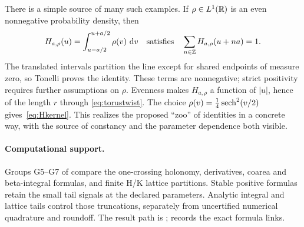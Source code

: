 There is a simple source of many such examples. If $\rho\in L^1(\mathbb R)$
is an even nonnegative probability density, then
\[
 H_{a,\rho}(u)=\int_{u-a/2}^{u+a/2}\rho(v)\,\mathop{}\!\mathrm d v
 \quad\text{satisfies}\quad
 \sum_{n\in\mathbb Z}H_{a,\rho}(u+na)=1.
\]
The translated intervals partition the line except for shared endpoints
of measure zero, so Tonelli proves the identity. These terms are
nonnegative; strict positivity requires further assumptions on $\rho$.
Evenness makes
$H_{a,\rho}$ a function of $|u|$, hence of the length $r$ through
\eqref{eq:torustwist}. The choice
$\rho(v)=\frac14\operatorname{sech}^2(v/2)$ gives~\eqref{eq:Hkernel}.
This realizes the proposed ``zoo'' of identities in a concrete way, with
the source of constancy and the parameter dependence both visible.

\paragraph{Computational support.}
Groups G5--G7 of 
compare the one-crossing holonomy, derivatives, coarea and beta-integral
formulas, and finite H/K lattice partitions. Stable positive formulas
retain the small tail signals at the declared parameters. Analytic
integral and lattice tails control those truncations, separately from
uncertified numerical quadrature and roundoff. The result path is
;
 records the exact formula links.
